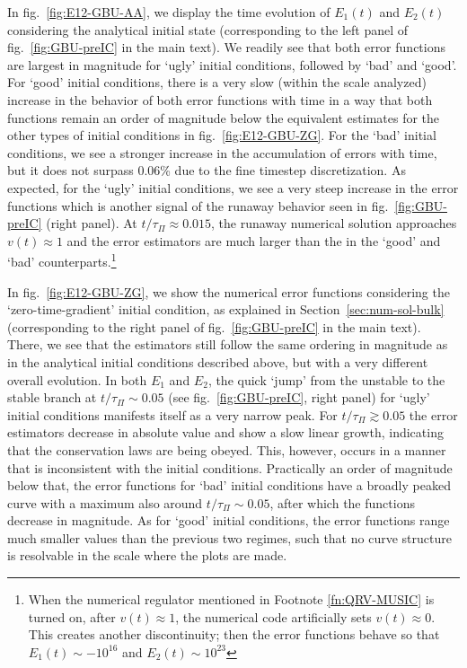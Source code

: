\documentclass[aps, prd, showkeys,superscriptaddress, nofootinbib,floatfix]{revtex4-2}
\begin{document}
In fig.~\ref{fig:E12-GBU-AA}, we display the time evolution of $E_{1}(t)$ and $E_{2}(t)$ considering the analytical initial state (corresponding to the left panel of  fig.~\ref{fig:GBU-preIC} in the main text). We readily see that both error functions are largest in magnitude for `ugly' initial conditions, followed by `bad' and `good'. For `good' initial conditions, there is a very slow (within the scale analyzed) increase in the behavior of both error functions with time in a way that both functions remain an order of magnitude below the equivalent estimates for the other types of initial conditions in fig.~\ref{fig:E12-GBU-ZG}. For the `bad' initial conditions, we see a stronger increase in the accumulation of errors with time, but it does not surpass 0.06\% due to the fine timestep discretization. As expected, for the `ugly' initial conditions, we see a very steep increase in the error functions which is another signal of the runaway behavior seen in fig.~\ref{fig:GBU-preIC} (right panel). At $t/\tau_{\Pi} \approx 0.015$, the runaway numerical solution approaches $v(t) \approx 1$ and the error estimators are much larger than the in the `good' and `bad' counterparts.\footnote{When the numerical regulator mentioned in Footnote \ref{fn:QRV-MUSIC} is turned on, after $v(t) \approx 1$, the numerical code artificially sets $v(t) \approx 0$. This creates another discontinuity; then the error functions behave so that $E_{1}(t) \sim - 10^{16}$ and $E_{2}(t) \sim 10^{23}$}

In fig.~\ref{fig:E12-GBU-ZG}, we show the numerical error functions considering the `zero-time-gradient' initial condition, as explained in Section~\ref{sec:num-sol-bulk} (corresponding to the right panel of  fig.~\ref{fig:GBU-preIC} in the main text). There, we see that the estimators still follow the same ordering in magnitude as in the analytical initial conditions described above, but with a very different overall evolution. In both $E_{1}$ and $E_{2}$, the quick `jump' from the unstable to the stable branch at $t/\tau_{\Pi} \sim 0.05$ (see fig.~\ref{fig:GBU-preIC}, right panel) for `ugly' initial conditions manifests itself as a very narrow peak. For $t/\tau_{\Pi} \gtrsim 0.05$ the error estimators decrease in absolute value and show a slow linear growth, indicating that the conservation laws are being obeyed. This, however, occurs in a manner that is inconsistent with the initial conditions. Practically an order of magnitude below that, the error functions for `bad' initial conditions have a broadly peaked curve with a maximum also around $t/\tau_{\Pi} \sim 0.05$, after which the functions decrease in magnitude. As for `good' initial conditions, the error functions range much smaller values than the previous two regimes, such that no curve structure is resolvable in the scale where the plots are made. 
\end{document}
